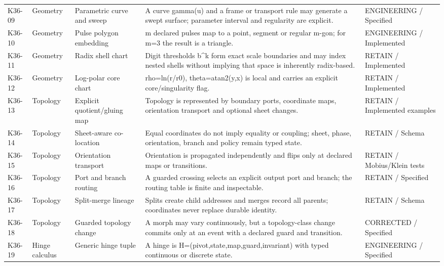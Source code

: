 \begin{longtable}{>{\raggedright\arraybackslash}p{1.0cm}>{\raggedright\arraybackslash}p{2.4cm}>{\raggedright\arraybackslash}p{3.2cm}>{\raggedright\arraybackslash}p{7.1cm}>{\raggedright\arraybackslash}p{2.3cm}}
\addlinespace[1.5pt]
K36-09 & Geometry & Parametric curve and sweep & A curve gamma(u) and a frame or transport rule may generate a swept surface; parameter interval and regularity are explicit. & ENGINEERING / Specified \\
\addlinespace[1.5pt]
K36-10 & Geometry & Pulse polygon embedding & m declared pulses map to a point, segment or regular m-gon; for m=3 the result is a triangle. & ENGINEERING / Implemented \\
\addlinespace[1.5pt]
K36-11 & Geometry & Radix shell chart & Digit thresholds b\textasciicircum{}k form exact scale boundaries and may index nested shells without implying that space is inherently radix-based. & RETAIN / Implemented \\
\addlinespace[1.5pt]
K36-12 & Geometry & Log-polar core chart & rho=ln(r/r0), theta=atan2(y,x) is local and carries an explicit core/singularity flag. & RETAIN / Implemented \\
\addlinespace[1.5pt]
K36-13 & Topology & Explicit quotient/gluing map & Topology is represented by boundary ports, coordinate maps, orientation transport and optional sheet changes. & RETAIN / Implemented examples \\
\addlinespace[1.5pt]
K36-14 & Topology & Sheet-aware co-location & Equal coordinates do not imply equality or coupling; sheet, phase, orientation, branch and policy remain typed state. & RETAIN / Schema \\
\addlinespace[1.5pt]
K36-15 & Topology & Orientation transport & Orientation is propagated independently and flips only at declared maps or transitions. & RETAIN / Mobius/Klein tests \\
\addlinespace[1.5pt]
K36-16 & Topology & Port and branch routing & A guarded crossing selects an explicit output port and branch; the routing table is finite and inspectable. & RETAIN / Specified \\
\addlinespace[1.5pt]
K36-17 & Topology & Split-merge lineage & Splits create child addresses and merges record all parents; coordinates never replace durable identity. & RETAIN / Schema \\
\addlinespace[1.5pt]
K36-18 & Topology & Guarded topology change & A morph may vary continuously, but a topology-class change commits only at an event with a declared guard and transition. & CORRECTED / Specified \\
\addlinespace[1.5pt]
K36-19 & Hinge calculus & Generic hinge tuple & A hinge is H=(pivot,state,map,guard,invariant) with typed continuous or discrete state. & ENGINEERING / Specified \\

\end{longtable}
